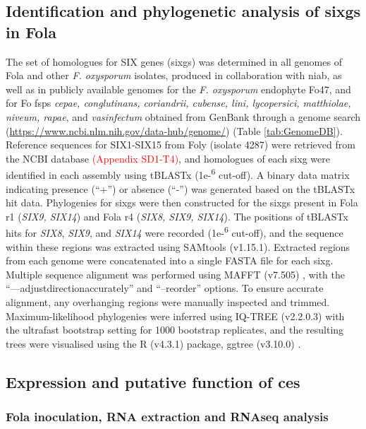 \subsection{Identification and phylogenetic analysis of \aclp{sixg} in \acl{Fola}}

The set of homologues for SIX genes (\acp{sixg}) was determined in all genomes of \ac{Fola} and other \textit{F. oxysporum} isolates, produced in collaboration with \ac{niab}, as well as in publicly available genomes for the \textit{F. oxysporum} endophyte Fo47, and for \ac{Fo} \acp{fsp} \textit{cepae, conglutinans, coriandrii, cubense, lini, lycopersici, matthiolae, niveum, rapae}, and \textit{vasinfectum} obtained from GenBank through a genome search (\url{https://www.ncbi.nlm.nih.gov/data-hub/genome/}) (Table \ref{tab:GenomeDB}). Reference sequences for SIX1-SIX15 from \ac{Foly} (isolate 4287) were retrieved from the NCBI database \textcolor{red}{(Appendix SD1-T4)}, and homologues of each \ac{sixg} were identified in each assembly using tBLASTx (1e-\textsuperscript{6} cut-off). A binary data matrix indicating presence (“+”) or absence (“-”) was generated based on the tBLASTx hit data. Phylogenies for \acp{sixg} were then constructed for the \acp{sixg} present in \ac{Fola} \ac{r1} (\textit{SIX9, SIX14}) and \ac{Fola} \ac{r4} (\textit{SIX8, SIX9, SIX14}). The positions of tBLASTx hits for \textit{SIX8}, \textit{SIX9}, and \textit{SIX14} were recorded (1e-\textsuperscript{6} cut-off), and the sequence within these regions was extracted using SAMtools (v1.15.1). Extracted regions from each genome were concatenated into a single FASTA file for each \ac{sixg}. Multiple sequence alignment was performed using MAFFT (v7.505) \parencite{Katoh2019}, with the “—adjustdirectionaccurately” and “–reorder” options. To ensure accurate alignment, any overhanging regions were manually inspected and trimmed. Maximum-likelihood phylogenies were inferred using IQ-TREE (v2.2.0.3) \parencite{Nguyen2015} with the ultrafast bootstrap setting for 1000 bootstrap replicates, and the resulting trees were visualised using the R (v4.3.1)  \parencite{R} package, ggtree (v3.10.0) \parencite{ggtree}.


\subsection{Expression and putative function of \acp{ce}}

\subsubsection{\Acf{Fola} inoculation, RNA extraction and RNAseq analysis}

